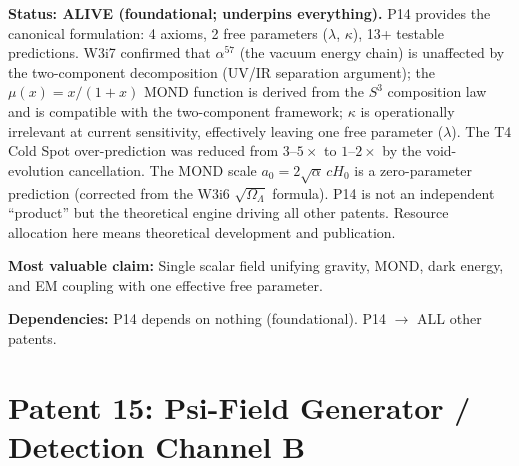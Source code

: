 \documentclass[11pt]{article}
\begin{document}
\begin{tcolorbox}[colback=green!5!white, colframe=green!40!black,
  title=\textbf{P14: ALIVE --- Resource Allocation: 4/5}]
\textbf{Status: ALIVE (foundational; underpins everything).}
P14 provides the canonical formulation: 4 axioms, 2 free parameters
($\lambda$, $\kappa$), 13+ testable predictions. W3i7 confirmed that
$\alpha^{57}$ (the vacuum energy chain) is unaffected by the
two-component decomposition (UV/IR separation argument); the
$\mu(x) = x/(1+x)$ MOND function is derived from the $S^3$ composition
law and is compatible with the two-component framework; $\kappa$ is
operationally irrelevant at current sensitivity, effectively leaving
one free parameter ($\lambda$). The T4 Cold Spot over-prediction was
reduced from $3$--$5\times$ to $1$--$2\times$ by the void-evolution
cancellation. The MOND scale $a_0 = 2\sqrt{\alpha}\,cH_0$ is a
zero-parameter prediction (corrected from the W3i6 $\sqrt{\Omega_\Lambda}$
formula). P14 is not an independent ``product'' but the theoretical
engine driving all other patents. Resource allocation here means
theoretical development and publication.

\textbf{Most valuable claim:} Single scalar field unifying gravity,
MOND, dark energy, and EM coupling with one effective free parameter.

\textbf{Dependencies:} P14 depends on nothing (foundational). P14
$\to$ ALL other patents.
\end{tcolorbox}

\section{Patent 15: Psi-Field Generator / Detection Channel B}
\label{sec:P15}
\end{document}

